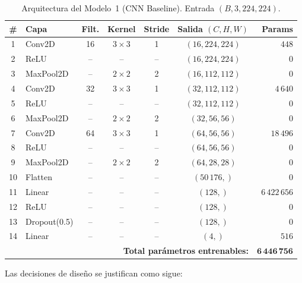 \begin{table}[!t]
\centering
\caption{Arquitectura del Modelo~1 (CNN Baseline). Entrada
$(B, 3, 224, 224)$.}
\label{tab:arq-m1}
\renewcommand{\arraystretch}{1.15}
\setlength{\tabcolsep}{4pt}
\footnotesize
\begin{tabular}{@{}clccccr@{}}
\toprule
\textbf{\#} & \textbf{Capa} & \textbf{Filt.} & \textbf{Kernel} &
\textbf{Stride} & \textbf{Salida $(C,H,W)$} & \textbf{Params} \\
\midrule
1  & Conv2D       & 16 & $3{\times}3$ & 1  & $(16,224,224)$ & $448$         \\
2  & ReLU         & -- & --           & -- & $(16,224,224)$ & $0$           \\
3  & MaxPool2D    & -- & $2{\times}2$ & 2  & $(16,112,112)$ & $0$           \\
4  & Conv2D       & 32 & $3{\times}3$ & 1  & $(32,112,112)$ & $4\,640$      \\
5  & ReLU         & -- & --           & -- & $(32,112,112)$ & $0$           \\
6  & MaxPool2D    & -- & $2{\times}2$ & 2  & $(32,56,56)$   & $0$           \\
7  & Conv2D       & 64 & $3{\times}3$ & 1  & $(64,56,56)$   & $18\,496$     \\
8  & ReLU         & -- & --           & -- & $(64,56,56)$   & $0$           \\
9  & MaxPool2D    & -- & $2{\times}2$ & 2  & $(64,28,28)$   & $0$           \\
10 & Flatten      & -- & --           & -- & $(50\,176,)$   & $0$           \\
11 & Linear       & -- & --           & -- & $(128,)$       & $6\,422\,656$ \\
12 & ReLU         & -- & --           & -- & $(128,)$       & $0$           \\
13 & Dropout(0.5) & -- & --           & -- & $(128,)$       & $0$           \\
14 & Linear       & -- & --           & -- & $(4,)$         & $516$         \\
\midrule
\multicolumn{6}{r}{\textbf{Total parámetros entrenables:}} & $\mathbf{6\,446\,756}$ \\
\bottomrule
\end{tabular}
\end{table}

Las decisiones de diseño se justifican como sigue:

